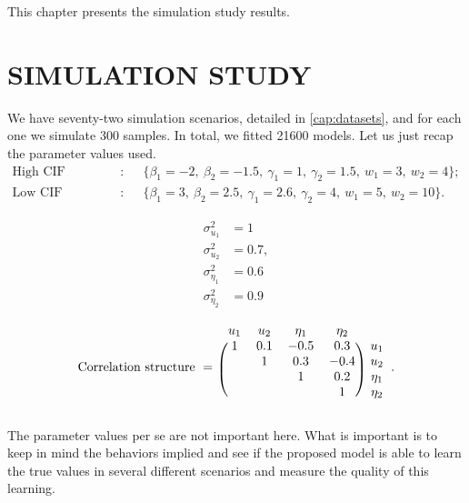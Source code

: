This chapter presents the simulation study results.

\section{SIMULATION STUDY}
\label{cap:simures}

We have seventy-two simulation scenarios, detailed in
\autoref{cap:datasets}, and for each one we simulate 300 samples. In
total, we fitted 21600 models. Let us just recap the parameter values
used.
\begin{align*}
 \text{High CIF configuration}:~&\quad
 \{\beta_{1} = -2,~\beta_{2} = -1.5,~\gamma_{1} = 1,~\gamma_{2} = 1.5,~
   w_{1} = 3,~w_{2} = 4
 \};\\
 \text{Low CIF configuration}:~&\quad
 \{\beta_{1} = 3,~\beta_{2} = 2.5,~\gamma_{1} = 2.6,~\gamma_{2} = 4,~
   w_{1} = 5,~w_{2} = 10
 \}.
\end{align*}
\begin{minipage}{0.15\textwidth}
 \begin{align*}
  \sigma_{u_{1}}^{2}   &= 1\\
  \sigma_{u_{2}}^{2}   &= 0.7,\\
  \sigma_{\eta_{1}}^{2} &= 0.6\\
  \sigma_{\eta_{2}}^{2} &= 0.9
 \end{align*}
\end{minipage}%
\begin{minipage}{0.85\textwidth}
 \[
  \text{Correlation structure}~=~\begin{blockarray}{ccccc}
                                  u_{1} & u_{2} & \eta_{1} & \eta_{2}\\
                                  \begin{block}{(cccc)c}
                                   1 & 0.1 & -0.5 &  0.3 & u_{1}\\
                                     &   1 &  0.3 & -0.4 & u_{2}\\
                                     &     &    1 &  0.2 & \eta_{1}\\
                                     &     &      &    1 & \eta_{2}\\
                                  \end{block}
                                 \end{blockarray}.
 \]
\end{minipage}

\vspace{0.3cm}
\noindent
The parameter values per se are not important here. What is important is
to keep in mind the behaviors implied and see if the proposed model is
able to learn the true values in several different scenarios and measure
the quality of this learning.

